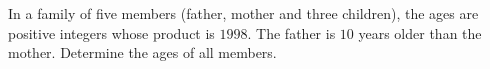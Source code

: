 In a family of five members (father, mother and three children), the ages are positive integers whose product is $1998$. The father is $10$ years older than the mother. Determine the ages of all members.
